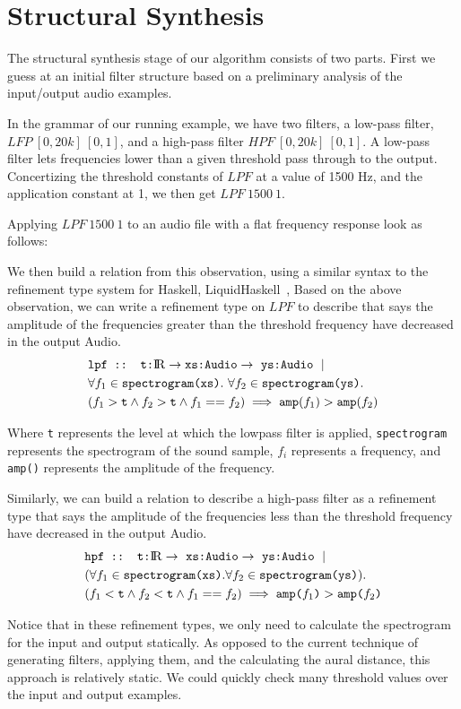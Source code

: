 \section{Structural Synthesis}
\label{sec:struct}

The structural synthesis stage of our algorithm consists of two parts.
First we guess at an initial filter structure based on a preliminary analysis of the input/output audio examples.

In the grammar of our running example, we have two filters, a low-pass filter, $LFP \ [0,20k]\ [0,1]$, and a high-pass filter $HPF\ [0,20k]\ [0,1]$.
A low-pass filter lets frequencies lower than a given threshold pass through to the output.
Concertizing the threshold constants of $LPF$ at a value of 1500 Hz, and the application constant at 1, we then get $LPF \ 1500 \ 1$.

Applying $LPF \ 1500 \ 1$ to an audio file with a flat frequency response look as follows:


We then build a relation from this observation, using a similar syntax to the refinement type system for Haskell, LiquidHaskell~\cite{vazou2014refinement}, 
Based on the above observation, we can write a refinement type on $LPF$ to describe that says the amplitude of the frequencies greater than the threshold frequency have decreased in the output Audio.
%
\begin{align*}
  &\texttt{lpf :: t:\reals} \to  \texttt{xs:Audio} \to\ \texttt{ys:Audio}\ \mid \\
  &\forall f_1 \in  \texttt{spectrogram(xs)}.\ \forall f_2 \in \texttt{spectrogram(ys)}. \\
  &(f_1 > \texttt{t}  \land  f_2 > \texttt{t}  \land f_1 == f_2) \implies \texttt{amp}(f_1) > \texttt{amp}(f_2)
\end{align*}

Where \texttt{t} represents the level at which the lowpass filter is applied, \texttt{spectrogram} represents the spectrogram of the sound sample, $f_i$ represents a frequency, and \texttt{amp()} represents the amplitude of the frequency. 

Similarly, we can build a relation to describe a high-pass filter as a refinement type that says the amplitude of the frequencies less than the threshold frequency have decreased in the output Audio.
%
\begin{align*}
  &\texttt{hpf :: t:\reals} \to\ \texttt{xs:Audio} \to\ \texttt{ys:Audio}\ \mid \\
  &(\forall f_1 \in \texttt{spectrogram(xs)}. \forall f_2 \in \texttt{spectrogram(ys)}). \\
  &(f_1 < \texttt{t} \land f_2 < \texttt{t} \land f_1 == f_2) \implies \texttt{amp(}f_1\texttt{)} > \texttt{amp(} f_2 \texttt{)} 
\end{align*}

Notice that in these refinement types, we only need to calculate the spectrogram for the input and output statically.
As opposed to the current technique of generating filters, applying them, and the calculating the aural distance, this approach is relatively static.
We could quickly check many threshold values over the input and output examples.

